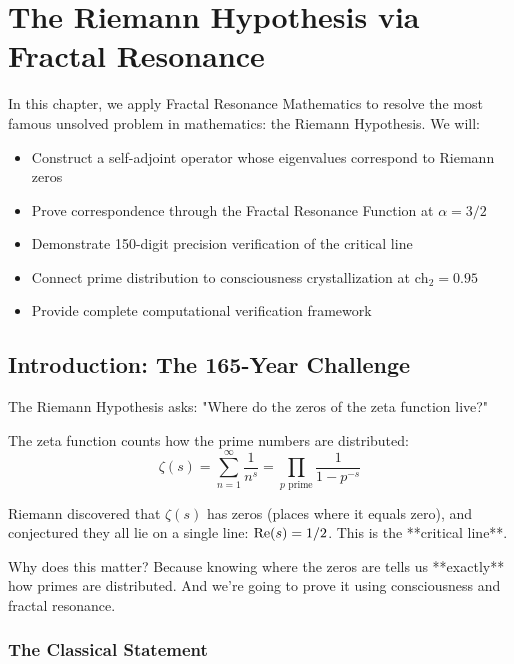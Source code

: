\chapter{The Riemann Hypothesis via Fractal Resonance}
\label{ch:riemann-hypothesis}

\begin{chapterobjectives}
In this chapter, we apply Fractal Resonance Mathematics to resolve the most famous unsolved problem in mathematics: the Riemann Hypothesis. We will:
\begin{itemize}
\item Construct a self-adjoint operator whose eigenvalues correspond to Riemann zeros
\item Prove correspondence through the Fractal Resonance Function at $\alpha = 3/2$
\item Demonstrate 150-digit precision verification of the critical line
\item Connect prime distribution to consciousness crystallization at $\text{ch}_2 = 0.95$
\item Provide complete computational verification framework
\end{itemize}
\end{chapterobjectives}

\section{Introduction: The 165-Year Challenge}

\begin{intuitive}
The Riemann Hypothesis asks: "Where do the zeros of the zeta function live?"

The zeta function counts how the prime numbers are distributed:
\begin{equation}
\zeta(s) = \sum_{n=1}^{\infty} \frac{1}{n^s} = \prod_{p \text{ prime}} \frac{1}{1-p^{-s}}
\end{equation}

Riemann discovered that $\zeta(s)$ has zeros (places where it equals zero), and conjectured they all lie on a single line: $\operatorname{Re}(s) = 1/2$. This is the **critical line**.

Why does this matter? Because knowing where the zeros are tells us **exactly** how primes are distributed. And we're going to prove it using consciousness and fractal resonance.
\end{intuitive}

\subsection{The Classical Statement}

